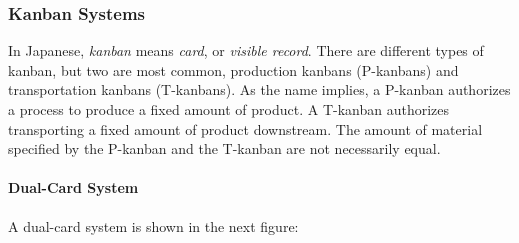 \documentclass[12pt]{article}
\begin{document}
\subsubsection{Kanban Systems}
In Japanese, \textit{kanban} means \textit{card}, or \textit{visible record}. There are different types of kanban, but two are most common, production kanbans (P-kanbans) and transportation kanbans (T-kanbans). As the name implies, a P-kanban authorizes a process to produce a fixed amount of product. A T-kanban authorizes transporting a fixed amount of product downstream. The amount of material specified by the P-kanban and the T-kanban are not necessarily equal.
\paragraph{Dual-Card System}
A dual-card system is shown in the next figure:
\begin{center}
\end{center}
\end{document}
